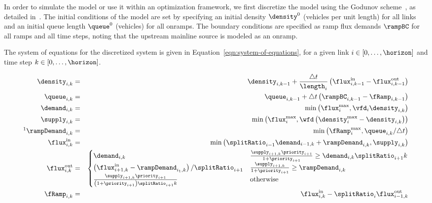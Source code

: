 In order to simulate the model or use it within an optimization framework, we first discretize the model using the Godunov scheme~\cite{godunov1959}, as detailed in~\cite{Monache2013}. The initial conditions of the model are set by specifying an initial density $\po$ (vehicles per unit length) for all links and an initial queue length $\lo$ (vehicles) for all onramps. The boundary conditions are specified as ramp flux demands $\rampBC$ for all ramps and all time steps, noting that the upstream mainline source is modeled as an onramp.

The system of equations for the discretized system is given in Equation~\eqref{eqn:system-of-equations}, for a given link $i \in \left[0,\ldots,\horizon\right]$ and time step $k \in \left[0,\ldots,\horizon\right]$.

\begin{equation}
\begin{aligned}
\label{eqn:system-of-equations}
\idx{\density}{i}{k} & = & 
\idx{\density}{i}{k-1} + \frac{\dt}{\length_i} \left(\idx{\fIn}{i}{k-1} - \idx{\fOut}{i}{k-1}\right)
\\
\idx{\queue}{i}{k} & = & 
\idx{\queue}{i}{k-1} + \dt \left(\idx{\rampBC}{i}{k-1} - \idx{\fRamp}{i}{k-1}\right) \\
\idx{\demand}{i}{k} & = & 
\min\left( \fmfd_i, \vfd_i \idx{\density}{i}{k} \right)
\\
\idx{\supply}{i}{k} & = & 
\min\left(\fmfd_i, \wfd \left( \pmfd_i - \idx{\density}{i}{k} \right)\right)
\\
\footnotemark
\idx{\rampDemand}{i}{k} & = & 
\min\left( \rampMax_i, \idx{\queue}{i}{k} / \dt \right)
\\
\idx{\fIn}{i}{k} & = & 
\min\left( \splitRatio_{i-1} \idx{\demand}{i-1}{k} + \idx{\rampDemand}{i}{k}, \idx{\supply}{i}{k} \right)
\\
\idx{\fOut}{i}{k} & = &
\begin{cases}
\idx{\demand}{i}{k} & 
\frac{\idx{\supply}{i+1}{k}\priority_{i+1}}{1 + \priority_{i+1}} \ge \idx{\demand}{i}{k}\splitRatio_{i+1}{k} \\
\left(\idx{\fIn}{i+1}{k} - \idx{\rampDemand}{i_1}{k}\right) / \splitRatio_{i +1} & 
\frac{\idx{\supply}{i+1}{k}}{1 + \priority_{i+1}} \ge \idx{\rampDemand}{i}{k} \\
\frac{\idx{\supply}{i+1}{k}\priority_{i+1}}{\left(1 + \priority_{i+1}\right)\splitRatio_{i+1}{k}} &
\text{otherwise}
\end{cases}
\\
\idx{\fRamp}{i}{k} & = & 
\idx{\fIn}{i}{k} - \splitRatio_{i} \idx{\fOut}{i-1}{k}
\end{aligned}
\end{equation}

